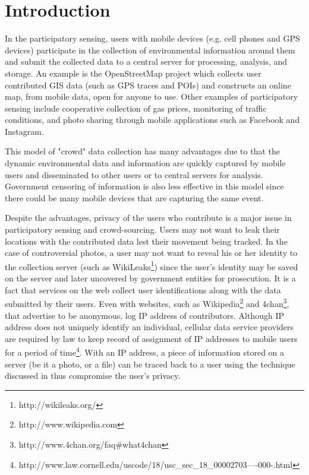 \section{Introduction}\label{sec-intro}
In the participatory sensing, users with mobile devices
(e.g. cell phones and GPS devices) participate in the collection of environmental
information around them and submit the collected data to a central server
for processing, analysis, and storage\cite{DBLP:conf/mobisys/MunRSYBEHHWB09}.
An example is the OpenStreetMap\cite{DBLP:journals/pervasive/HaklayW08}
project which collects user contributed GIS
data (such as GPS traces and POIs) and constructs an online map, from mobile
data, open for anyone to use.
Other examples of participatory sensing
include cooperative collection of gas prices\cite{DBLP:conf/dcoss/DongKCB08},
monitoring of traffic conditions\cite{DBLP:conf/dcoss/ConceicaoFB08}, and
photo sharing through mobile applications such as Facebook and Instagram.

This model of "crowd" data collection has many advantages due to that the
dynamic environmental data and information are quickly captured by mobile
users and disseminated to other users or to central servers for analysis.
Government censoring of information is also less
effective in this model since there could be many mobile devices that are
capturing the same event.

Despite the advantages, privacy of the users who contribute is a major
issue in participatory sensing and crowd-sourcing. Users may not want to
leak their locations with the contributed data lest their movement being
tracked. In the case of controversial photos, a user may not want to
reveal his or her identity to the collection server (such as
WikiLeaks\footnote{http://wikileaks.org/})
since the user's identity may be saved on the server and later
uncovered by government entities for prosecution. It is a fact that
services on the web collect user identifications along with the data
submitted by their users\cite{wiki_privacy}. Even with websites, such as
Wikipedia\footnote{http://www.wikipedia.com} and
4chan\footnote{http://www.4chan.org/faq\#what4chan}, that advertise to be
anonymous, log IP address of contributors.
Although IP address does not uniquely identify an individual, cellular
data service providers are required by law to keep record of assignment of
IP addresses to mobile users for a period of time\footnote{http://www.law.cornell.edu/uscode/18/usc\_sec\_18\_00002703----000-.html}.
With an IP address, a piece of
information stored on a server (be it a photo, or a file) can be traced
back to a user using the technique discussed in \cite{DBLP:journals/ijufks/Sweene02}
thus compromise the user's privacy.

